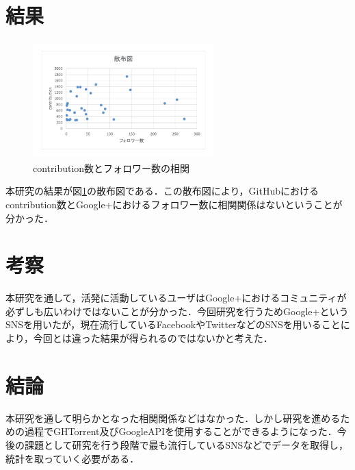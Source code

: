 \documentclass[uplatex,twocolumn,dvipdfmx]{jsarticle}
\begin{document}
\section{結果}

\begin{figure}[thb]
\begin{minipage}{0,8\hsize}
\centering
\vspace{-3zh}
\includegraphics[width=70mm,height=45mm]{figure.pdf}
\caption{contribution数とフォロワー数の相関}
\label{サンプル図}
\end{minipage}
\end{figure}

本研究の結果が図\ref{サンプル図}の散布図である．この散布図により，GitHubにおけるcontribution数とGoogle+におけるフォロワー数に相関関係はないということが分かった．

\section{考察}

本研究を通して，活発に活動しているユーザはGoogle+におけるコミュニティが必ずしも広いわけではないことが分かった．今回研究を行うためGoogle+というSNSを用いたが，現在流行しているFacebookやTwitterなどのSNSを用いることにより，今回とは違った結果が得られるのではないかと考えた．

\section{結論}

本研究を通して明らかとなった相関関係などはなかった．しかし研究を進めるための過程でGHTorrent及びGoogleAPIを使用することができるようになった．今後の課題として研究を行う段階で最も流行しているSNSなどでデータを取得し，統計を取っていく必要がある．



\end{document}
